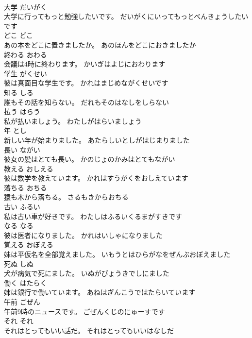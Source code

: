 \documentclass[8pt]{extreport}
\begin{document}
\begin{CJK}{UTF8}{min}
\\	大学	だいがく	
\\	大学に行ってもっと勉強したいです。	だいがくにいってもっとべんきょうしたいです	
\\	どこ	どこ	
\\	あの本をどこに置きましたか。	あのほんをどこにおきましたか	
\\	終わる	おわる	
\\	会議は4時に終わります。	かいぎはよじにおわります	
\\	学生	がくせい	
\\	彼は真面目な学生です。	かれはまじめながくせいです	
\\	知る	しる	
\\	誰もその話を知らない。	だれもそのはなしをしらない	
\\	払う	はらう	
\\	私が払いましょう。	わたしがはらいましょう	
\\	年	とし	
\\	新しい年が始まりました。	あたらしいとしがはじまりました	
\\	長い	ながい	
\\	彼女の髪はとても長い。	かのじょのかみはとてもながい	
\\	教える	おしえる	
\\	彼は数学を教えています。	かれはすうがくをおしえています	
\\	落ちる	おちる	
\\	猿も木から落ちる。	さるもきからおちる	
\\	古い	ふるい	
\\	私は古い車が好きです。	わたしはふるいくるまがすきです	
\\	なる	なる	
\\	彼は医者になりました。	かれはいしゃになりました	
\\	覚える	おぼえる	
\\	妹は平仮名を全部覚えました。	いもうとはひらがなをぜんぶおぼえました	
\\	死ぬ	しぬ	
\\	犬が病気で死にました。	いぬがびょうきでしにました	
\\	働く	はたらく	
\\	姉は銀行で働いています。	あねはぎんこうではたらいています	
\\	午前	ごぜん	
\\	午前9時のニュースです。	ごぜんくじのにゅーすです	
\\	それ	それ	
\\	それはとってもいい話だ。	それはとってもいいはなしだ	

\end{CJK}
\end{document}
